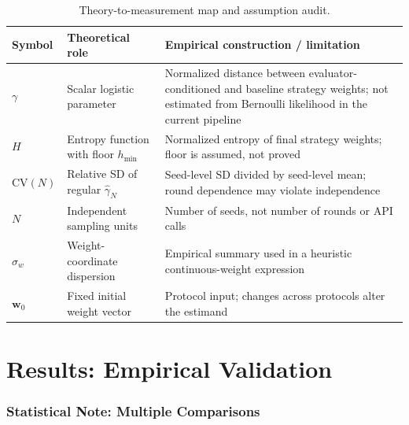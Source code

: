 \documentclass[11pt]{article}
\begin{document}
\begin{table}[t]
\centering
\caption{Theory-to-measurement map and assumption audit.}
\label{tab:estimand-map}
\small
\begin{tabular}{@{}p{}p{}p{}@{}}
\toprule
Symbol & Theoretical role & Empirical construction / limitation \\
\midrule
$\gamma$ & Scalar logistic parameter & Normalized distance between evaluator-conditioned and baseline strategy weights; not estimated from Bernoulli likelihood in the current pipeline \\
$H$ & Entropy function with floor $h_{\min}$ & Normalized entropy of final strategy weights; floor is assumed, not proved \\
$\mathrm{CV}(N)$ & Relative SD of regular $\hat\gamma_N$ & Seed-level SD divided by seed-level mean; round dependence may violate independence \\
$N$ & Independent sampling units & Number of seeds, not number of rounds or API calls \\
$\sigma_w$ & Weight-coordinate dispersion & Empirical summary used in a heuristic continuous-weight expression \\
$\mathbf w_0$ & Fixed initial weight vector & Protocol input; changes across protocols alter the estimand \\
\bottomrule
\end{tabular}
\end{table}

\section{Results: Empirical Validation}

\subsubsection*{Statistical Note: Multiple Comparisons}
\end{document}
